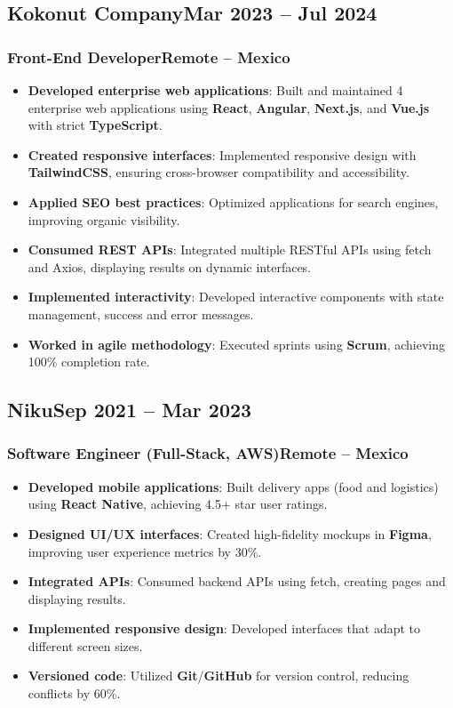 \documentclass[a4paper,10pt]{article}
\newcommand{\kw}[1]{\textbf{\textcolor{keyword}{#1}}}
\newcommand{\tech}[1]{\textbf{\textcolor{tech}{#1}}}
\begin{document}
\subsection*{Kokonut Company\hfill\textbf{Mar 2023 -- Jul 2024}}
\subsubsection*{Front-End Developer\hfill Remote -- Mexico}
\begin{itemize}[noitemsep, leftmargin=*]
    \item \textbf{Developed enterprise web applications}: Built and maintained 4 enterprise web applications using \tech{React}, \tech{Angular}, \tech{Next.js}, and \tech{Vue.js} with strict \tech{TypeScript}.
    \item \textbf{Created responsive interfaces}: Implemented responsive design with \tech{TailwindCSS}, ensuring cross-browser compatibility and accessibility.
    \item \textbf{Applied SEO best practices}: Optimized applications for search engines, improving organic visibility.
    \item \textbf{Consumed REST APIs}: Integrated multiple RESTful APIs using fetch and Axios, displaying results on dynamic interfaces.
    \item \textbf{Implemented interactivity}: Developed interactive components with state management, success and error messages.
    \item \textbf{Worked in agile methodology}: Executed sprints using \kw{Scrum}, achieving 100\% completion rate.
\end{itemize}

\subsection*{Niku\hfill\textbf{Sep 2021 -- Mar 2023}}
\subsubsection*{Software Engineer (Full-Stack, AWS)\hfill Remote -- Mexico}
\begin{itemize}[noitemsep, leftmargin=*]
    \item \textbf{Developed mobile applications}: Built delivery apps (food and logistics) using \tech{React Native}, achieving 4.5+ star user ratings.
    \item \textbf{Designed UI/UX interfaces}: Created high-fidelity mockups in \tech{Figma}, improving user experience metrics by 30\%.
    \item \textbf{Integrated APIs}: Consumed backend APIs using fetch, creating pages and displaying results.
    \item \textbf{Implemented responsive design}: Developed interfaces that adapt to different screen sizes.
    \item \textbf{Versioned code}: Utilized \tech{Git}/\tech{GitHub} for version control, reducing conflicts by 60\%.
\end{itemize}
\end{document}
